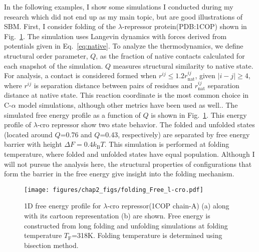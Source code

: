 \documentclass[../talant.diss.submit.tex]{subfiles}
\begin{document}
In the following examples, I show some simulations I conducted during my
research which did not end up as my main topic, but are good illustrations of
SBM.  First, I consider folding of the $\lambda$-repressor protein(PDB:1COP)
shown in Fig.~\ref{fig:folding_Free_l-cro}. The simulation uses Langevin
dynamics with forces derived from potentials given in Eq.~\ref{eq:native}. To
analyze the thermodynamics, we define structural order parameter, $Q$, as the
fraction of native contacts calculated for each snapshot of the simulation. $Q$
measures structural similarity to native state. For analysis, a contact is
considered formed when $r^{ij} \leq 1.2r_{\mathrm{nat}}^{ij}$, given
$|i - j| \ge 4$, where $r^{ij}$ is separation distance between pairs of residues
and $r_{\mathrm{nat}}^{ij}$ separation distance at native state.  This reaction
coordinate is the most common choice in C-$\alpha$ model simulations, although
other metrics have been used as well.\cite{clementi:03int,noel:10,wu:08}.  The
simulated free energy profile as a function of $Q$ is shown in
Fig.~\ref{fig:folding_Free_l-cro}.  This energy profile of $\lambda$-cro
repressor show two state behavior. The folded and unfolded states (located
around $Q$=0.76 and $Q$=0.43, respectively) are separated by free energy barrier
with height $\Delta{F}=0.4k_{\mathrm{B}}T$. This simulation is performed at
folding temperature, where folded and unfolded states have equal
population. Although I will not pursue the analysis here, the structural
properties of configurations that form the barrier in the free energy give
insight into the folding mechanism.
%
%
%
%


\begin{figure}[htp!]
  \begin{centering}
    \texttt{[image: figures/chap2\_figs/folding\_Free\_l-cro.pdf]}
    \caption{1D free energy profile for $\lambda$-cro repressor(1COP chain-A)
      (a) along with its cartoon representation (b) are shown. Free energy is
      constructed from long folding and unfolding simulations at folding temperature
      $T_{\mathrm{F}}$=318K. Folding temperature is determined using bisection method.}
    \label{fig:folding_Free_l-cro}
  \end{centering}
\end{figure}
\end{document}
